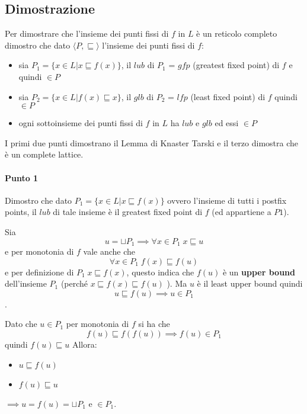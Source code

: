 \documentclass{article}
\begin{document}
\subsection{Dimostrazione}
Per dimostrare che l'insieme dei punti fissi di $f$ in $L$ è un reticolo completo dimostro che dato $\langle P,\sqsubseteq\rangle$ l'insieme dei punti fissi di $f$:
\begin{itemize}
    \item sia $P_1 =\{x \in L | x  \sqsubseteq f(x)\}$, il $lub$ di $P_1$ = $gfp$ (greatest fixed point) di $f$ e quindi $\in P$
    \item sia $P_2 =\{x \in L | f(x)  \sqsubseteq x\}$, il $glb$ di $P_2$ = $lfp$ (least fixed point) di $f$ quindi $\in P$
    \item ogni sottoinsieme dei punti fissi di $f$ in $L$ ha $lub$ e $glb$ ed essi $\in P$
\end{itemize}

I primi due punti dimostrano il Lemma di Knaster Tarski e il terzo dimostra che è un complete lattice.

\paragraph{Punto 1}

Dimostro che dato $P_{1}=\{x \in L | x  \sqsubseteq f(x)\}$ ovvero l'insieme di tutti i postfix points, il $lub$ di tale insieme è il greatest fixed point di $f$ (ed appartiene a $P1$).


Sia $$u=\sqcup P_{1} \implies \forall x \in P_{1} \; x \sqsubseteq u$$
 e per monotonia di $f$ vale anche che $$\forall x \in P_{1} \; f(x)\sqsubseteq f(u)$$ e per definizione di $P_{1}\; x \sqsubseteq f(x)$, questo indica che $f(u)$ è un \textbf{upper bound} dell'insieme $P_{1}$ (perché $x \sqsubseteq f(x) \sqsubseteq f(u)$ ). Ma $u$ è il least upper bound quindi $$u \sqsubseteq f(u) \implies u \in P_{1}$$.

Dato che $u \in P_{1}$ per monotonia di $f$ si ha che $$f(u)\sqsubseteq f(f(u)) \implies f(u) \in P_{1}$$
 quindi $f(u)\sqsubseteq u$ Allora:
\begin{itemize}
    \item $u\sqsubseteq f(u)$
    \item $f(u)\sqsubseteq u$
\end{itemize}
$\implies u=f(u)=\sqcup P_{1}$ e $\in P_{1}$.
\end{document}
